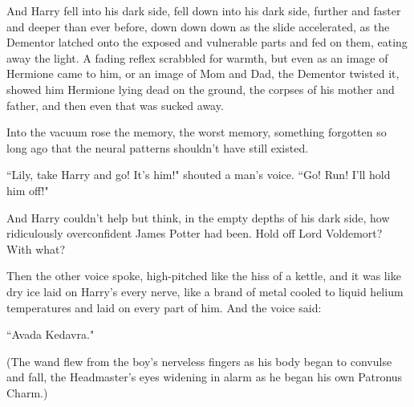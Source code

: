 And Harry fell into his dark side, fell down into his dark side, further and faster and deeper than ever before, down down down as the slide accelerated, as the Dementor latched onto the exposed and vulnerable parts and fed on them, eating away the light. A fading reflex scrabbled for warmth, but even as an image of Hermione came to him, or an image of Mom and Dad, the Dementor twisted it, showed him Hermione lying dead on the ground, the corpses of his mother and father, and then even that was sucked away.

Into the vacuum rose the memory, the worst memory, something forgotten so long ago that the neural patterns shouldn't have still existed.

\begin{em}
``Lily, take Harry and go! It's him!" shouted a man's voice. ``Go! Run! I'll hold him off!"

And Harry couldn't help but think, in the empty depths of his dark side, how ridiculously overconfident James Potter had been. Hold off Lord Voldemort? With what?

Then the other voice spoke, high-pitched like the hiss of a kettle, and it was like dry ice laid on Harry's every nerve, like a brand of metal cooled to liquid helium temperatures and laid on every part of him. And the voice said:

``Avada Kedavra."
\end{em}

(The wand flew from the boy's nerveless fingers as his body began to convulse and fall, the Headmaster's eyes widening in alarm as he began his own Patronus Charm.)

